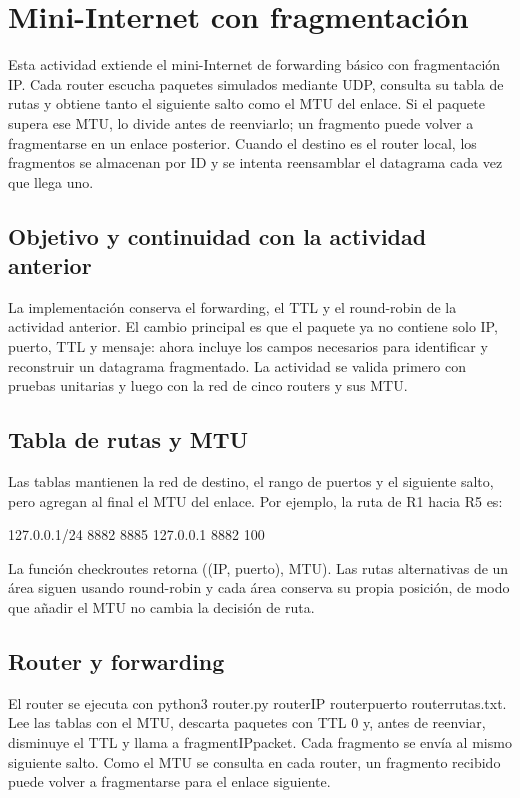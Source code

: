 \documentclass[
	spanish, %
	letterpaper, oneside
]{article}
\newcommand{\codeunderscore}{\textunderscore\allowbreak}
\newcommand{\code}[1]{{\let\_\codeunderscore#1}}     %
\begin{document}
\templatePortrait

\templatePagecfg

\templateIndex

\templateFinalcfg


\section{Mini-Internet con fragmentación}
Esta actividad extiende el mini-Internet de forwarding básico con fragmentación IP. Cada router escucha paquetes simulados mediante UDP, consulta su tabla de rutas y obtiene tanto el siguiente salto como el MTU del enlace. Si el paquete supera ese MTU, lo divide antes de reenviarlo; un fragmento puede volver a fragmentarse en un enlace posterior. Cuando el destino es el router local, los fragmentos se almacenan por ID y se intenta reensamblar el datagrama cada vez que llega uno.

\subsection{Objetivo y continuidad con la actividad anterior}
La implementación conserva el forwarding, el TTL y el round-robin de la actividad anterior. El cambio principal es que el paquete ya no contiene solo IP, puerto, TTL y mensaje: ahora incluye los campos necesarios para identificar y reconstruir un datagrama fragmentado. La actividad se valida primero con pruebas unitarias y luego con la red de cinco routers y sus MTU.

\subsection{Tabla de rutas y MTU}
Las tablas mantienen la red de destino, el rango de puertos y el siguiente salto, pero agregan al final el MTU del enlace. Por ejemplo, la ruta de R1 hacia R5 es:
\begin{salida}
127.0.0.1/24 8882 8885 127.0.0.1 8882 100
\end{salida}
La función \code{check\_routes} retorna \code{((IP, puerto), MTU)}. Las rutas alternativas de un área siguen usando round-robin y cada área conserva su propia posición, de modo que añadir el MTU no cambia la decisión de ruta.

\subsection{Router y forwarding}
El router se ejecuta con \code{python3 router.py router\_IP router\_puerto router\_rutas.txt}. Lee las tablas con el MTU, descarta paquetes con TTL 0 y, antes de reenviar, disminuye el TTL y llama a \code{fragment\_IP\_packet}. Cada fragmento se envía al mismo siguiente salto. Como el MTU se consulta en cada router, un fragmento recibido puede volver a fragmentarse para el enlace siguiente.
\end{document}

